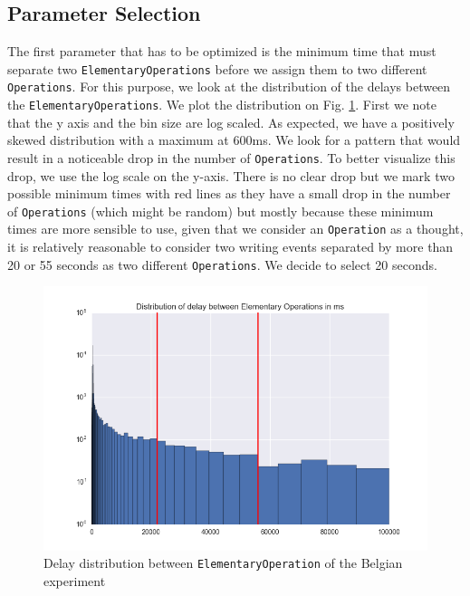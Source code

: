 \documentclass[a4, twocolumn, 12pt]{article}
\begin{document}
\subsection{Parameter Selection}
The first parameter that has to be optimized is the minimum time that must separate two \texttt{ElementaryOperations} before we assign them to two different \texttt{Operations}. For this purpose, we look at the distribution of the delays between the \texttt{ElementaryOperations}. We plot the distribution on Fig. \ref{distribution_delay}. First we note that the y axis and the bin size are log scaled. As expected, we have a positively skewed distribution with a maximum at 600ms. We look for a pattern that would result in a noticeable drop in the number of \texttt{Operations}. To better visualize this drop, we use the log scale on the y-axis. There is no clear drop but we mark two possible minimum times with red lines as they have a small drop in the number of \texttt{Operations} (which might be random) but mostly because these minimum times are more sensible to use, given that we consider an \texttt{Operation} as a thought, it is relatively reasonable to consider two writing events separated by more than 20 or 55 seconds as two different \texttt{Operations}. We decide to select 20 seconds. 
\begin{figure}[h]
\centering
\includegraphics[scale=0.42]{figures/delay_between_elem_op.png}
\caption{Delay distribution between \texttt{ElementaryOperation} of the Belgian experiment}
\label{distribution_delay}
\end{figure}
\end{document}
